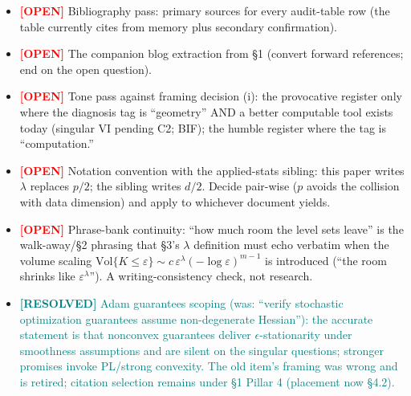\documentclass[11pt]{article}
\newcommand{\resolved}[1]{\textcolor{teal}{\textbf{[RESOLVED]} #1}}
\newcommand{\open}{\textcolor{red}{\textbf{[OPEN]}} }
\begin{document}
\begin{itemize}[itemsep=4pt]
\item \open Bibliography pass: primary sources for every audit-table row
(the table currently cites from memory plus secondary confirmation).
\item \open The companion blog extraction from \S1 (convert forward
references; end on the open question).
\item \open Tone pass against framing decision (i): the provocative
register only where the diagnosis tag is ``geometry'' AND a better
computable tool exists today (singular VI pending C2; BIF); the humble
register where the tag is ``computation.''
\item \open Notation convention with the applied-stats sibling: this
paper writes $\lambda$ replaces $p/2$; the sibling writes $d/2$. Decide
pair-wise ($p$ avoids the collision with data dimension) and apply to
whichever document yields.
\item \open Phrase-bank continuity: ``how much room the level sets
leave'' is the walk-away/\S2 phrasing that \S3's $\lambda$ definition
must echo verbatim when the volume scaling
$\mathrm{Vol}\{K \le \varepsilon\} \sim c\,\varepsilon^{\lambda}
(-\log\varepsilon)^{m-1}$ is introduced (``the room shrinks like
$\varepsilon^{\lambda}$''). A writing-consistency check, not research.
\item \resolved{Adam guarantees scoping (was: ``verify stochastic
optimization guarantees assume non-degenerate Hessian''): the accurate
statement is that nonconvex guarantees deliver $\epsilon$-stationarity
under smoothness assumptions and are silent on the singular questions;
stronger promises invoke PL/strong convexity. The old item's framing was
wrong and is retired; citation selection remains under \S1 Pillar 4
(placement now \S4.2).}
\end{itemize}
\end{document}
